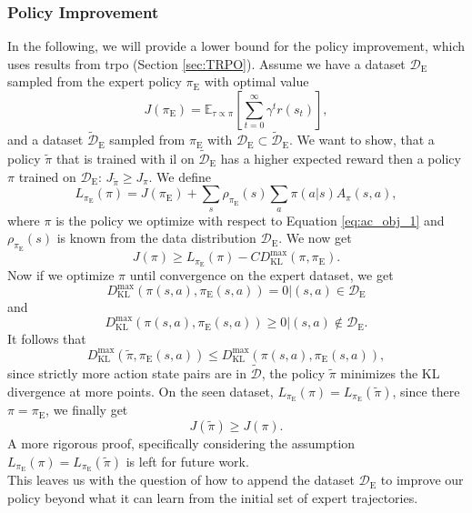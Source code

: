 \subsubsection{Policy Improvement}
\label{sec:impro_bounds_avc}
In the following, we will provide a lower bound for the policy improvement, which uses results from \ac{trpo} (Section \ref{sec:TRPO}). 
Assume we have a dataset $\mathcal{D}_{\text{E}}$ sampled from the expert policy $\pi_{\text{E}}$ with optimal value 
$$J(\pi_{\text{E}}) =\mathbb{E}_{\tau \propto \pi}\left[\sum_{t=0}^{\infty}  \gamma^t r(s_t) \right],$$
and a dataset $\tilde{\mathcal{D}}_{\text{E}}$ sampled from $\pi_{\text{E}}$ with $\mathcal{D}_{\text{E}} \subset \tilde{\mathcal{D}}_{\text{E}}$. 
We want to show, that a policy $\tilde{\pi}$ that is trained with \ac{il} on $\tilde{\mathcal{D}}_{\text{E}}$ has 
a higher expected reward then a policy $\pi$ trained on $\mathcal{D}_{\text{E}}$: $J_{\tilde{\pi}} \geq J_{\pi}$.
We define 
$$L_{\pi_{\text{E}}}(\pi) = J(\pi_{\text{E}}) + \sum_s \rho_{\pi_{\text{E}}}(s) \sum_a \pi(a|s) A_{\pi}(s,a),$$
where $\pi$ is the policy we optimize with respect to Equation \ref{eq:ac_obj_1} and $\rho_{\pi_{\text{E}}}(s)$ is known from 
the data distribution $\mathcal{D}_{\text{E}}$. We now get 
$$J({\pi}) \geq L_{\pi_{\text{E}}}({\pi}) - C D^{\max}_{\operatorname{KL}} (\pi,\pi_{\text{E}}).$$
Now if we optimize $\pi$ until convergence on the expert dataset, we get 
$$D^{\max}_{\operatorname{KL}}(\pi(s,a),\pi_{\text{E}}(s,a)) = 0 |(s,a) \in \mathcal{D}_{\text{E}}$$
and 
$$D^{\max}_{\operatorname{KL}}(\pi(s,a),\pi_{\text{E}}(s,a)) \geq 0 |(s,a) \notin \mathcal{D}_{\text{E}}.$$
It follows that 
$$D^{\max}_{\operatorname{KL}}(\tilde{\pi},\pi_{\text{E}}(s,a)) \leq D^{\max}_{\operatorname{KL}}(\pi(s,a),\pi_{\text{E}}(s,a)),$$
since strictly more action state pairs are in $\tilde{\mathcal{D}}$, the policy $\tilde{\pi}$ minimizes the KL divergence at more points.
On the seen dataset, $L_{\pi_{\text{E}}}({\pi}) = L_{\pi_{\text{E}}}({\tilde{\pi}})$, since there $\pi = \pi_{\text{E}}$, we finally get 
\begin{equation}
    J(\tilde{\pi}) \geq J({\pi}).
\end{equation}
A more rigorous proof, specifically considering the assumption $L_{\pi_{\text{E}}}({\pi}) = L_{\pi_{\text{E}}}({\tilde{\pi}})$ is left for future work.\\

This leaves us with the question of how to append the dataset $\mathcal{D}_{\text{E}}$ to improve our policy beyond what it can learn from the 
initial set of expert trajectories.\\

